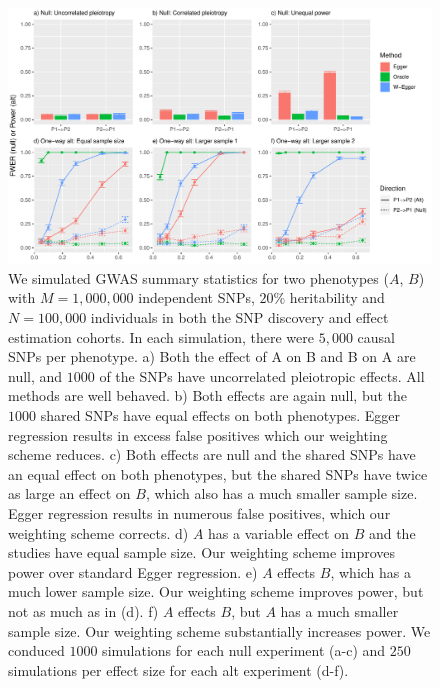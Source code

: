 \documentclass{article}
\begin{document}
\begin{figure}\label{figure1}
\includegraphics[width=\textwidth]{figures/figure1.pdf}
\caption{We simulated GWAS summary statistics for two phenotypes ($A$, $B$) with $M=1,000,000$
independent SNPs, $20\%$ heritability and $N = 100,000$ individuals in both
 the SNP discovery and effect estimation cohorts. In each simulation, there
 were $5,000$ causal SNPs per phenotype. a) Both the effect of A on B and B on A are null,
 and $1000$ of the SNPs have uncorrelated pleiotropic effects. All methods are well behaved.
 b) Both effects are again null, but the $1000$ shared SNPs have equal effects on both
 phenotypes. Egger regression results in excess false positives which our weighting scheme
 reduces. c) Both effects are null and the shared SNPs have an equal effect on both phenotypes,
 but the shared SNPs have twice as large an effect on $B$, which also has a much smaller sample
 size. Egger regression results in numerous false positives, which our weighting scheme corrects.
 d) $A$ has a variable effect on $B$ and the studies have equal sample size. Our weighting
 scheme improves power over standard Egger regression. e) $A$ effects $B$, which has a much
 lower sample size. Our weighting scheme improves power, but not as much as in (d). f) $A$
  effects $B$, but $A$ has a much smaller sample size. Our weighting scheme substantially increases
  power. We conduced $1000$ simulations for each null experiment (a-c) and $250$ simulations
  per effect size for each alt experiment (d-f). }
\end{figure}
\end{document}
